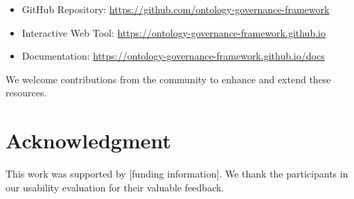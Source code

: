 \documentclass[conference]{IEEEtran}
\begin{document}
\begin{itemize}
    \item GitHub Repository: \url{https://github.com/ontology-governance-framework}
    \item Interactive Web Tool: \url{https://ontology-governance-framework.github.io}
    \item Documentation: \url{https://ontology-governance-framework.github.io/docs}
\end{itemize}

We welcome contributions from the community to enhance and extend these resources.

\section*{Acknowledgment}
This work was supported by [funding information]. We thank the participants in our usability evaluation for their valuable feedback.
\end{document}
